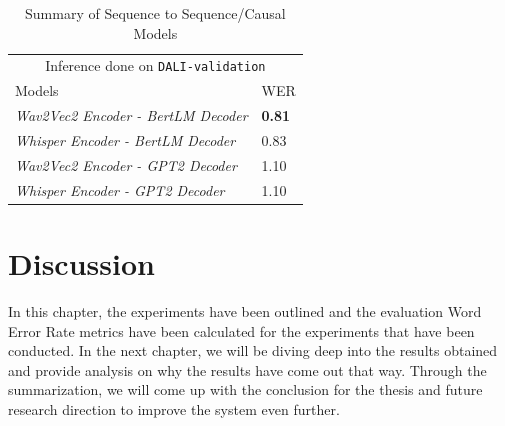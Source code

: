 \renewcommand{\arraystretch}{2}
\setlength{\arrayrulewidth}{0.3mm}
\begin{table}[H]
\small
\begin{center}
\begin{tabular}{ |p{7cm}| p{3cm}| }
\multicolumn{2}{c}{Inference done on \texttt{DALI-validation}} \\
\cline{1-2}
 Models     &  WER  \\
\hline  \hline
 \textit{Wav2Vec2 Encoder - BertLM Decoder}            &  \textbf{0.81}  \\
 \textit{Whisper Encoder - BertLM Decoder }           & 0.83 \\
 \textit{Wav2Vec2 Encoder - GPT2 Decoder }        & 1.10 \\
 \textit{Whisper Encoder - GPT2 Decoder}      & 1.10 \\
\hline  \hline
\end{tabular}
\caption{\label{encoderdecoder} Summary of Sequence to Sequence/Causal Models}
\end{center}
\end{table}


\section{Discussion}
\label{sec:discussion-research}

In this chapter, the experiments have been outlined and the evaluation Word Error Rate metrics have been calculated for the experiments that have been conducted. In the next chapter, we will be diving deep into the results obtained and provide analysis on why the results have come out that way. Through the summarization, we will come up with the conclusion for the thesis and future research direction to improve the system even further.
